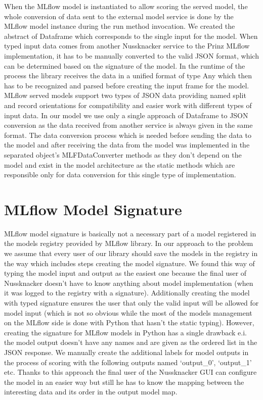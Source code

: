 When the MLflow model is instantiated to allow scoring the served model, the whole conversion of data
sent to the external model service is done by the MLflow model instance during the run method invocation.
We created the abstract of Dataframe which corresponds to the single input for the model. When typed input
data comes from another Nussknacker service to the Prinz MLflow implementation, it has to be manually
converted to the valid JSON format, which can be determined based on the signature of the model. In the
runtime of the process the library receives the data in a unified format of type Any which then has to
be recognized and parsed before creating the input frame for the model. MLflow served models support two
types of JSON data providing named split and record orientations for compatibility and easier work with
different types of input data. In our model we use only a single approach of Dataframe to JSON conversion
as the data received from another service is always given in the same format. The data conversion process
which is needed before sending the data to the model and after receiving the data from the model was
implemented in the separated object’s MLFDataConverter methods as they don’t depend on the model and
exist in the model architecture as the static methods which are responsible only for data conversion
for this single type of implementation.

\section{MLflow Model Signature}

MLflow model signature is basically not a necessary part of a model registered in the models registry
provided by MLflow library. In our approach to the problem we assume that every user of our library
should save the models in the registry in the way which includes steps creating the model signature.
We found this way of typing the model input and output as the easiest one because the final user of
Nussknacker doesn’t have to know anything about model implementation (when it was logged to the registry
with a signature). Additionally creating the model with typed signature ensures the user that only the
valid input will be allowed for model input (which is not so obvious while the most of the models management
on the MLflow side is done with Python that hasn’t the static typing). However, creating the signature
for MLflow models in Python has a single drawback e.i. the model output doesn’t have any names and are
given as the ordered list in the JSON response. We manually create the additional labels for model outputs
in the process of scoring with the following outputs named ‘output_0’, ‘output_1’ etc. Thanks to this
approach the final user of the Nussknacker GUI can configure the model in an easier way but still he has
to know the mapping between the interesting data and its order in the output model map.

